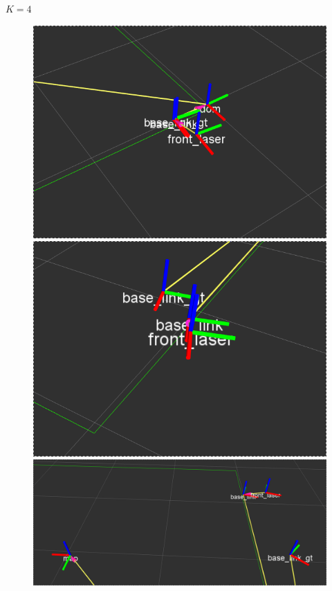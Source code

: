 
\pagebreak
$K = 4$


\begin{figure}[!htb]
  \includegraphics[width=\linewidth]{imagenesExpLazoCerrado/k4/1.png}
\endminipage\hfill
{}
  \includegraphics[width=\linewidth]{imagenesExpLazoCerrado/k4/2.png}
\endminipage\hfill
{}%
  \includegraphics[width=\linewidth]{imagenesExpLazoCerrado/k4/4.png}
\endminipage
\end{figure}

